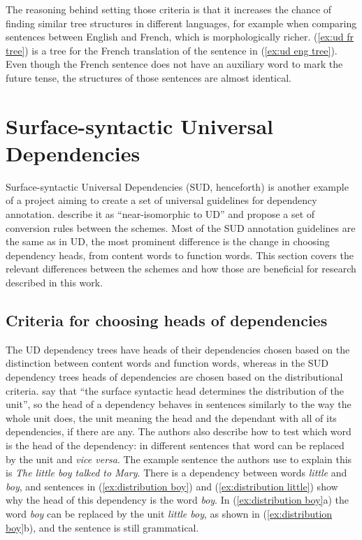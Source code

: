 The reasoning behind setting those criteria is that it increases the chance of finding similar tree structures in different languages, for example when comparing sentences between English and French, which is morphologically richer. (\ref{ex:ud fr tree}) is a tree for the French translation of the sentence in (\ref{ex:ud eng tree}). Even though the French sentence does not have an auxiliary word to mark the future tense, the structures of those sentences are almost identical.

\section{Surface-syntactic Universal Dependencies}\label{sec:sud}
Surface-syntactic Universal Dependencies (SUD, henceforth) is another example of a project aiming to create a set of universal guidelines for dependency annotation. \cite{gerdes-etal-2018-sud} describe it as ``near-isomorphic to UD'' and propose a set of conversion rules between the schemes. Most of the SUD annotation guidelines are the same as in UD, the most prominent difference is the change in choosing dependency heads, from content words to function words. This section covers the relevant differences between the schemes and how those are beneficial for research described in this work.

\subsection{Criteria for choosing heads of dependencies}\label{sec:sud criteria}
The UD dependency trees have heads of their dependencies chosen based on the distinction between content words and function words, whereas in the SUD dependency trees heads of dependencies are chosen based on the distributional criteria. \cite{gerdes-etal-2018-sud} say that ``the surface syntactic head determines the distribution of the unit'', so the head of a dependency behaves in sentences similarly to the way the whole unit does, the unit meaning the head and the dependant with all of its dependencies, if there are any. The authors also describe how to test which word is the head of the dependency: in different sentences that word can be replaced by the unit and \textsl{vice versa}. The example sentence the authors use to explain this is \textsl{The little boy talked to Mary}. There is a dependency between words \textsl{little} and \textsl{boy}, and sentences in (\ref{ex:distribution boy}) and (\ref{ex:distribution little}) show why the head of this dependency is the word \textsl{boy}. In (\ref{ex:distribution boy}a) the word \textsl{boy} can be replaced by the unit \textsl{little boy}, as shown in (\ref{ex:distribution boy}b), and the sentence is still grammatical. 

